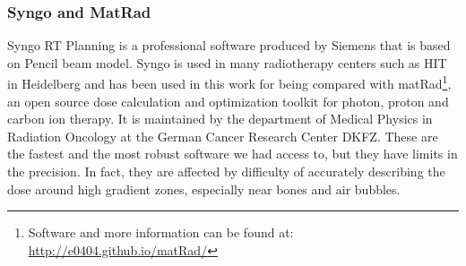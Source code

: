 \documentclass[12pt, a4paper, twoside]{book}
\begin{document}
\subsubsection{Syngo and MatRad}
Syngo RT Planning is a professional software produced by Siemens that is based on Pencil beam model. Syngo is used in many radiotherapy centers such as HIT in Heidelberg and has been used in this work for being compared with matRad\footnote{Software and more information can be found at: \url{http://e0404.github.io/matRad/}}, an open source dose calculation and optimization toolkit for photon, proton and carbon ion therapy. It is maintained by the department of Medical Physics in Radiation Oncology at the German Cancer Research Center DKFZ. 
These are the fastest and the most robust software we had access to, but they have limits in the precision. In fact, they are affected by difficulty of accurately describing the dose around high gradient zones, especially near bones and air bubbles.
\end{document}
